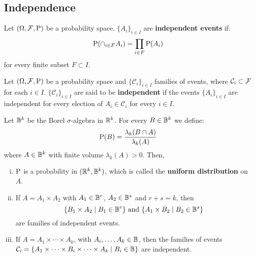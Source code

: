 \subsection{Independence}

\begin{definition}
	Let $\PS$ be a probability space. $\{ A_i \}_{i \in I }$ are \textbf{independent events} if:
	\[
		\P (\cap_{i \in F} A_i) = \prod_{i \in F} \P(A_i)
	\]
	for every finite subset $F \subset I$.
\end{definition}

\begin{definition}
	Let $\PS$ be a probability space and $\{ \mathcal{C}_i \}_{i \in I}$ families of events, where $\mathcal{C}_i \subset \F$ for each $i \in I$. $\{ \mathcal{C}_i \}_{i \in I}$ are said to be \textbf{independent} if the events $\{ A_i \}_{i \in I }$ are independent for every election of $A_i \in \mathcal{C}_i$ for every $i \in I$.
\end{definition}

\begin{example}
	Let $\B^k$ be the Borel $\sigma$-algebra in $\R^k$. For every $B \in \B^k$ we define:
	\[
		\P(B) = \frac{\lambda_k(B \cap A)}{\lambda_k(A)}
	\]
	where $A \in \B^k$ with finite volume $\lambda_k(A) > 0$. Then,
	\begin{enumerate}[i)]
		\item $\P$ is a probability in $(\R^k, \B^k)$, which is called the \textbf{uniform distribution} on $A$.
		\item If $A = A_1 \times A_2$ with $A_1 \in \B^r$, $A_2 \in \B^s$ and $r + s = k$, then
		\[
			\{ B_1 \times A_2 \mid B_1 \in \B^r \} \text{ and } \{ A_1 \times B_2 \mid B_2 \in \B^s \} 
		\]
		are families of independent events.
		\item If $ A = A_1 \times \cdots \times A_k$, with $A_i, \ldots, A_k \in \B$, then the families of events $\mathcal{C}_i = \{ A_1 \times \cdots \times B_i \times \cdots \times A_k \mid B_i \in \B \}$ are independent.
	\end{enumerate}
\end{example}
